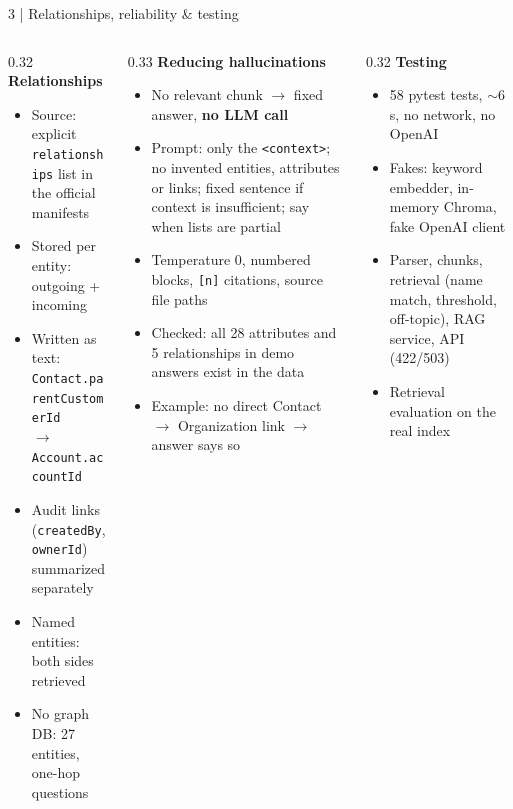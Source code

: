\documentclass[aspectratio=169,10pt]{beamer}
\newcommand{\code}[1]{\texttt{#1}}
\begin{document}
\begin{frame}{3 \;|\; Relationships, reliability \& testing}
\begin{columns}[T]
\begin{column}{0.32\textwidth}
\small\textbf{\color{accent}Relationships}
\scriptsize
\begin{itemize}
  \item Source: explicit \code{relationships} list in the official manifests
  \item Stored per entity: outgoing + incoming
  \item Written as text:\\ \code{Contact.parentCustomerId}\\ \hspace*{2mm}$\rightarrow$ \code{Account.accountId}
  \item Audit links (\code{createdBy}, \code{ownerId}) summarized separately
  \item Named entities: both sides retrieved
  \item No graph DB: 27 entities, one-hop questions
\end{itemize}
\end{column}

\begin{column}{0.33\textwidth}
\small\textbf{\color{accent}Reducing hallucinations}
\scriptsize
\begin{itemize}
  \item No relevant chunk $\rightarrow$ fixed answer, \textbf{no LLM call}
  \item Prompt: only the \code{<context>}; no invented entities, attributes or links;
        fixed sentence if context is insufficient; say when lists are partial
  \item Temperature 0, numbered blocks, \code{[n]} citations, source file paths
  \item Checked: all 28 attributes and 5 relationships in demo answers exist in the data
  \item Example: no direct Contact $\rightarrow$ Organization link $\rightarrow$ answer says so
\end{itemize}
\end{column}

\begin{column}{0.32\textwidth}
\small\textbf{\color{accent}Testing}
\scriptsize
\begin{itemize}
  \item 58 pytest tests, $\sim$6\,s, no network, no OpenAI
  \item Fakes: keyword embedder, in-memory Chroma, fake OpenAI client
  \item Parser, chunks, retrieval (name match, threshold, off-topic), RAG service, API (422/503)
  \item Retrieval evaluation on the real index
\end{itemize}


\end{column}
\end{columns}
\end{frame}
\end{document}
